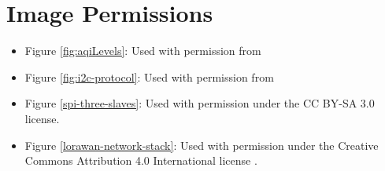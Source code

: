 \section{Image Permissions}


\begin{itemize}
\item Figure \ref{fig:aqiLevels}: Used with permission from

\item Figure \ref{fig:i2c-protocol}: Used with permission from \cite{i2c-protocol}

\item Figure \ref{spi-three-slaves}: Used with permission under the CC BY-SA 3.0 license. \cite{spi-image}

\item Figure \ref{lorawan-network-stack}: Used with permission under the Creative Commons Attribution 4.0 International license \cite{lorawan-network-stack}.


\end{itemize}
